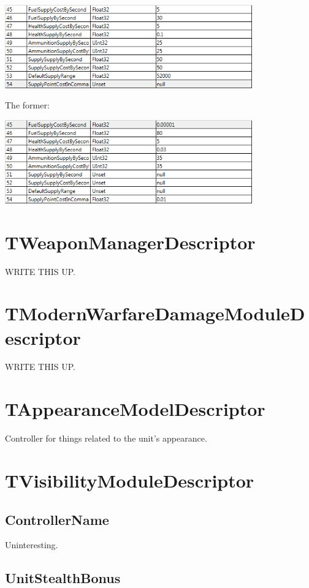 \documentclass{article}
\begin{document}
\includegraphics[width=0.8\textwidth]{screenshot_supply}

The former:

\includegraphics[width=0.8\textwidth]{screenshot_supply_fob}

\section{TWeaponManagerDescriptor}

WRITE THIS UP.

\section{TModernWarfareDamageModuleDescriptor}

WRITE THIS UP.

\section{TAppearanceModelDescriptor}

Controller for things related to the unit's appearance.

\section{TVisibilityModuleDescriptor}

\subsection{ControllerName}

Uninteresting.

\subsection{UnitStealthBonus}
\end{document}
